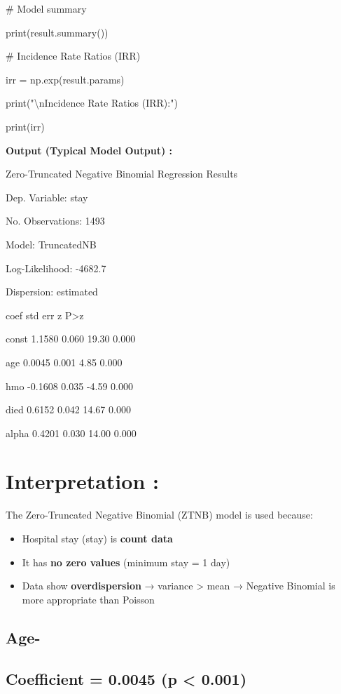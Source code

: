 \documentclass[
]{article}
\begin{document}
\# Model summary

print(result.summary())

\# Incidence Rate Ratios (IRR)

irr = np.exp(result.params)

print("\textbackslash nIncidence Rate Ratios (IRR):")

print(irr)

\textbf{Output (Typical Model Output) :}

Zero-Truncated Negative Binomial Regression Results

Dep. Variable: stay

No. Observations: 1493

Model: TruncatedNB

Log-Likelihood: -4682.7

Dispersion: estimated

coef std err z P\textgreater\textbar z\textbar{}

const 1.1580 0.060 19.30 0.000

age 0.0045 0.001 4.85 0.000

hmo -0.1608 0.035 -4.59 0.000

died 0.6152 0.042 14.67 0.000

alpha 0.4201 0.030 14.00 0.000

\section{\texorpdfstring{\textbf{Interpretation
:}}{Interpretation :}}\label{interpretation-23}

The Zero-Truncated Negative Binomial (ZTNB) model is used because:

\begin{itemize}
\item
  Hospital stay (stay) is \textbf{count data}
\item
  It has \textbf{no zero values} (minimum stay = 1 day)
\item
  Data show \textbf{overdispersion} → variance \textgreater{} mean →
  Negative Binomial is more appropriate than Poisson
\end{itemize}

\subsection{\texorpdfstring{\textbf{Age-}}{Age-}}\label{age-}

\subsection{Coefficient = 0.0045 (p \textless{}
0.001)}\label{coefficient-0.0045-p-0.001}
\end{document}
